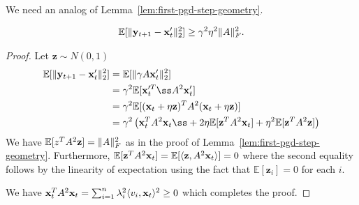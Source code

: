 We need an analog of Lemma~\ref{lem:first-pgd-step-geometry}.
\begin{lemma}
	\begin{align*}
	\mathbb E[\|\mathbf y_{t + 1} - \mathbf x_{t}'\|_2^2] \ge \gamma^2 \eta^2 \|A\|_F^2.
	\end{align*}
\end{lemma}
\newcommand{\vz}{\mathbf z}
\begin{proof}
	Let $\vz \sim N(0,1)$
	\begin{align*}
	\mathbb E[\|\vy_{t + 1} - \vx_{t}'\|_2^2] &= \mathbb E[\|\gamma A \vx_t'\|_2^2] \\ 
	&= \gamma^2 \mathbb E[\vx_t'^Tß A^2 \vx_t'] \\
	&= \gamma^2 \mathbb E[(\vx_t + \eta \vz)^T A^2 (\vx_t + \eta \vz)] \\
	& = \gamma^2 \left(\vx_t^T A^2 \vx_tß + 2 \eta \mathbb E[\vz^T A^2 \vx_t] + \eta^2 \mathbb E[\vz^T A^2 \vz]\right)
	\end{align*}
	We have $\mathbb E[\mathbb \vz^T A^2 \vz] = \|A\|_F^2$ as in the proof of Lemma~\ref{lem:first-pgd-step-geometry}.
	Furthermore, $\mathbb E[\vz^T A^2 \vx_t] = \mathbb E[\langle \vz, A^2 \vx_t\rangle] = 0$ where the second equality follows by the linearity of expectation using the fact that $\mathbb E[\vz_i] = 0$ for each $i$.
	
	We have $\mathbf x_t^T A^2 \mathbf x_t = \sum_{i = 1}^n \lambda_i^2 \langle v_i, \mathbf x_t\rangle^2 \ge 0$ which completes the proof.
	
	
\end{proof}